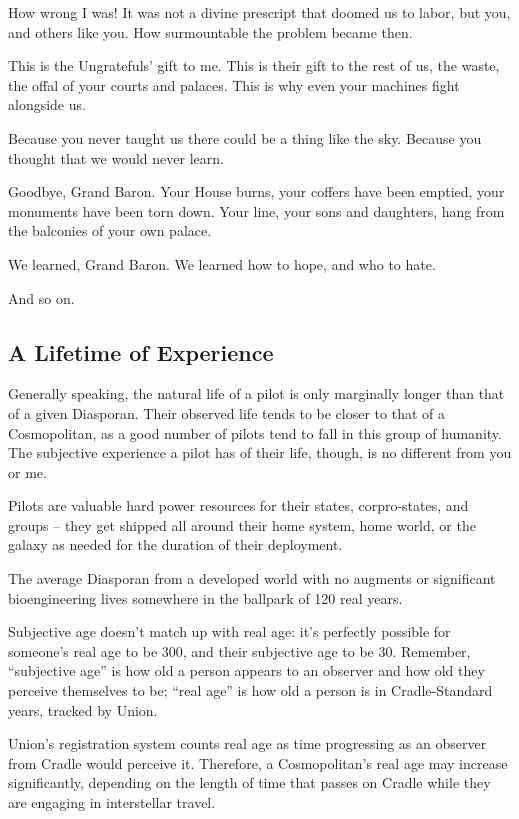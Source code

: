 {How wrong I was! It was not a divine prescript that doomed us to labor, but you, and others like
you. How surmountable the problem became then.

This is the Ungratefuls' gift to me. This is their gift to the rest of us, the waste, the offal of your
courts and palaces. This is why even your machines fight alongside us.

Because you never taught us there could be a thing like the sky. Because you thought that we
would never learn.

Goodbye, Grand Baron. Your House burns, your coffers have been emptied, your monuments
have been torn down. Your line, your sons and daughters, hang from the balconies of your own
palace.

We learned, Grand Baron. We learned how to hope, and who to hate.}

And so on.

\subsection{A Lifetime of Experience}

Generally speaking, the natural life of a pilot is only marginally longer than that of a given
Diasporan. Their observed life tends to be closer to that of a Cosmopolitan, as a good number of
pilots tend to fall in this group of humanity. The subjective experience a pilot has of their life,
though, is no different from you or me.

Pilots are valuable hard power resources for their states, corpro-states, and groups -- they get
shipped all around their home system, home world, or the galaxy as needed for the duration of
their deployment.

The average Diasporan from a developed world with no augments or significant bioengineering
lives somewhere in the ballpark of 120 real years.

Subjective age doesn't match up with real age: it's perfectly possible for someone's real age to
be 300, and their subjective age to be 30. Remember, ``subjective age'' is how old a person
appears to an observer and how old they perceive themselves to be; ``real age'' is how old a
person is in Cradle-Standard years, tracked by Union.

Union's registration system counts real age as time progressing as an observer from Cradle
would perceive it. Therefore, a Cosmopolitan's real age may increase significantly, depending on
the length of time that passes on Cradle while they are engaging in interstellar travel.

